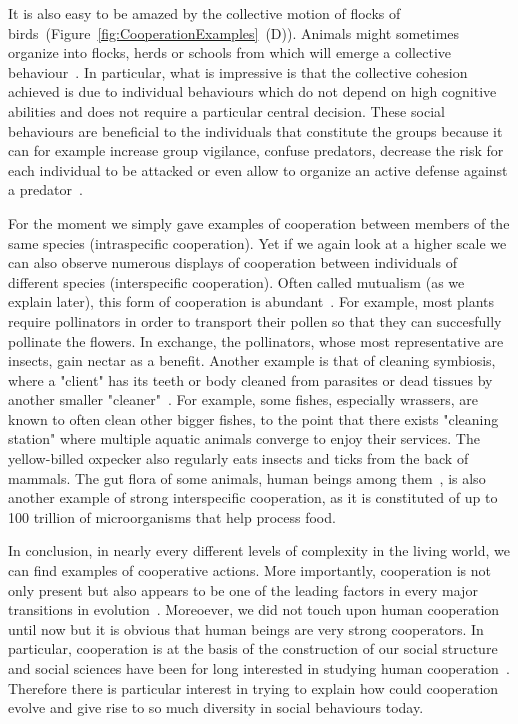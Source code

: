     It is also easy to be amazed by the collective motion of flocks of birds~(Figure~\ref{fig:CooperationExamples}~(D)). Animals might sometimes organize into flocks, herds or schools from which will emerge a collective behaviour~\parencite{Couzin2002, Couzin2003}. In particular, what is impressive is that the collective cohesion achieved is due to individual behaviours which do not depend on high cognitive abilities and does not require a particular central decision. These social behaviours are beneficial to the individuals that constitute the groups because it can for example increase group vigilance, confuse predators, decrease the risk for each individual to be attacked or even allow to organize an active defense against a predator~\parencite{Hamilton1971, Olson2013}.

    For the moment we simply gave examples of cooperation between members of the same species (intraspecific cooperation). Yet if we again look at a higher scale we can also observe numerous displays of cooperation between individuals of different species (interspecific cooperation). Often called mutualism (as we explain later), this form of cooperation is abundant~\parencite{Bshary2004}. For example, most plants require pollinators in order to transport their pollen so that they can succesfully pollinate the flowers. In exchange, the pollinators, whose most representative are insects, gain nectar as a benefit. Another example is that of cleaning symbiosis, where a "client" has its teeth or body cleaned from parasites or dead tissues by another smaller "cleaner"~\parencite{Poulin1996}. For example, some fishes, especially wrassers, are known to often clean other bigger fishes, to the point that there exists "cleaning station" where multiple aquatic animals converge to enjoy their services. The yellow-billed oxpecker also regularly eats insects and ticks from the back of mammals. The gut flora of some animals, human beings among them~\parencite{Backhed2005}, is also another example of strong interspecific cooperation, as it is constituted of up to 100 trillion of microorganisms that help process food.



    In conclusion, in nearly every different levels of complexity in the living world, we can find examples of cooperative actions. More importantly, cooperation is not only present but also appears to be one of the leading factors in every major transitions in evolution~\parencite{Szathmary1995}. Moreoever, we did not touch upon human cooperation until now but it is obvious that human beings are very strong cooperators. In particular, cooperation is at the basis of the construction of our social structure and social sciences have been for long interested in studying human cooperation~\parencite{West2011a}. Therefore there is particular interest in trying to explain how could cooperation evolve and give rise to so much diversity in social behaviours today. 



